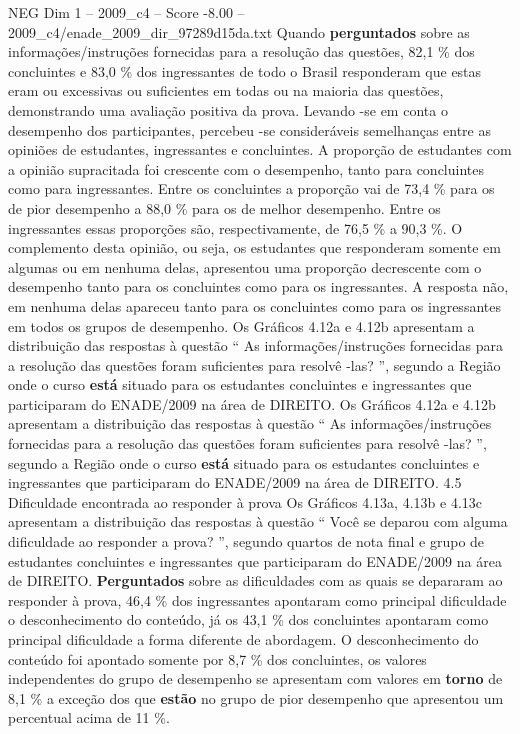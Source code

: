 \begin{textsample}{NEG Dim 1 – 2009\_c4 – Score -8.00 – 2009\_c4/enade\_2009\_dir\_97289d15da.txt}
Quando \textbf{perguntados} sobre as informações/instruções fornecidas para a resolução das questões, 82,1 \% dos concluintes e 83,0 \% dos ingressantes de todo o Brasil responderam que estas eram ou excessivas ou suficientes em todas ou na maioria das questões, demonstrando uma avaliação positiva da prova.
Levando -se em conta o desempenho dos participantes, percebeu -se consideráveis semelhanças entre as opiniões de estudantes, ingressantes e concluintes.
A proporção de estudantes com a opinião supracitada foi crescente com o desempenho, tanto para concluintes como para ingressantes.
Entre os concluintes a proporção vai de 73,4 \% para os de pior desempenho a 88,0 \% para os de melhor desempenho.
Entre os ingressantes essas proporções são, respectivamente, de 76,5 \% a 90,3 \%.
O complemento desta opinião, ou seja, os estudantes que responderam somente em algumas ou em nenhuma delas, apresentou uma proporção decrescente com o desempenho tanto para os concluintes como para os ingressantes.
A resposta não, em nenhuma delas apareceu tanto para os concluintes como para os ingressantes em todos os grupos de desempenho.
Os Gráficos 4.12a e 4.12b apresentam a distribuição das respostas à questão “ As informações/instruções fornecidas para a resolução das questões foram suficientes para resolvê -las? ”, segundo a Região onde o curso \textbf{está} situado para os estudantes concluintes e ingressantes que participaram do ENADE/2009 na área de DIREITO.
Os Gráficos 4.12a e 4.12b apresentam a distribuição das respostas à questão “ As informações/instruções fornecidas para a resolução das questões foram suficientes para resolvê -las? ”, segundo a Região onde o curso \textbf{está} situado para os estudantes concluintes e ingressantes que participaram do ENADE/2009 na área de DIREITO. 4.5 Dificuldade encontrada ao responder à prova Os Gráficos 4.13a, 4.13b e 4.13c apresentam a distribuição das respostas à questão “ Você se deparou com alguma dificuldade ao responder a prova? ”, segundo quartos de nota final e grupo de estudantes concluintes e ingressantes que participaram do ENADE/2009 na área de DIREITO. \textbf{Perguntados} sobre as dificuldades com as quais se depararam ao responder à prova, 46,4 \% dos ingressantes apontaram como principal dificuldade o desconhecimento do conteúdo, já os 43,1 \% dos concluintes apontaram como principal dificuldade a forma diferente de abordagem.
O desconhecimento do conteúdo foi apontado somente por 8,7 \% dos concluintes, os valores independentes do grupo de desempenho se apresentam com valores em \textbf{torno} de 8,1 \% a exceção dos que \textbf{estão} no grupo de pior desempenho que apresentou um percentual acima de 11 \%.

\end{textsample}
